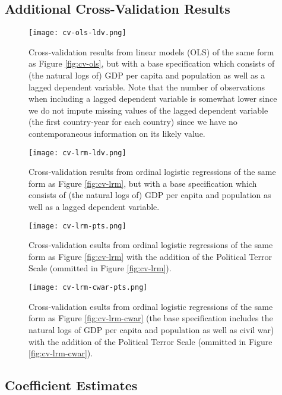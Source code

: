 \documentclass[12pt]{article}
\begin{document}
\clearpage

\subsection{Additional Cross-Validation Results}

\begin{figure}[!htpb]
\texttt{[image: cv-ols-ldv.png]}
\caption{Cross-validation results from linear models (OLS) of the same form as Figure \ref{fig:cv-ols}, but with a base specification which consists of (the natural logs of) GDP per capita and population as well as a lagged dependent variable. Note that the number of observations when including a lagged dependent variable is somewhat lower since we do not impute missing values of the lagged dependent variable (the first country-year for each country) since we have no contemporaneous information on its likely value.}
\label{fig:cv-ols-ldv}
\end{figure}

\begin{figure}[!htpb]
\texttt{[image: cv-lrm-ldv.png]}
\caption{Cross-validation results from ordinal logistic regressions of the same form as Figure \ref{fig:cv-lrm}, but with a base specification which consists of (the natural logs of) GDP per capita and population as well as a lagged dependent variable.}
\label{fig:cv-lrm-ldv}
\end{figure}

\begin{figure}[!htpb]
\texttt{[image: cv-lrm-pts.png]}
\caption{Cross-validation esults from ordinal logistic regressions of the same form as Figure \ref{fig:cv-lrm} with the addition of the Political Terror Scale (ommitted in Figure \ref{fig:cv-lrm}).}
\label{fig:cv-lrm-pts}
\end{figure}

\begin{figure}[!htpb]
\texttt{[image: cv-lrm-cwar-pts.png]}
\caption{Cross-validation esults from ordinal logistic regressions of the same form as Figure \ref{fig:cv-lrm-cwar} (the base specification includes the natural logs of GDP per capita and population as well as civil war) with the addition of the Political Terror Scale (ommitted in Figure \ref{fig:cv-lrm-cwar}).}
\label{fig:cv-lrm-cwar-pts}
\end{figure}

\clearpage

\subsection{Coefficient Estimates}
\end{document}
